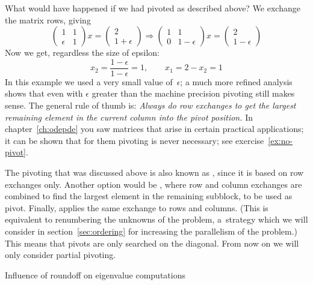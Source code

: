 What would have happened if we had pivoted as described above?
We exchange the matrix rows, giving
\[ 
  \begin{pmatrix}
    1&1\\ \epsilon&1
  \end{pmatrix} x =
  \begin{pmatrix}
    2\\1+\epsilon
  \end{pmatrix}
\Rightarrow
  \begin{pmatrix}
    1&1\\ 0&1-\epsilon
  \end{pmatrix} x=
    \begin{pmatrix}
      2\\ 1-\epsilon
    \end{pmatrix}
\]
Now we get, regardless the size of epsilon:
\[ x_2=\frac{1-\epsilon}{1-\epsilon}=1,\qquad
x_1=2-x_2=1
\]
In this example we used a very small value of~$\epsilon$; a much more
refined analysis shows that even with $\epsilon$ greater than the
machine precision pivoting still makes sense. The general rule of
thumb is: \emph{Always do row exchanges to get the largest remaining
  element in the current column into the pivot position.} In
chapter~\ref{ch:odepde} you saw matrices that arise in certain
practical applications; it can be shown that for them pivoting is
never necessary; see exercise~\ref{ex:no-pivot}.

The pivoting that was discussed above is also known as
, since it is
based on row exchanges only.  Another option would be
, where row and column exchanges are
combined to find the largest element in the remaining subblock, to be
used as pivot. Finally,  applies the
same exchange to rows and columns. (This is equivalent to renumbering
the unknowns of the problem, a~strategy which we will consider in
section~\ref{sec:ordering} for increasing the parallelism of the problem.)
This means that pivots are only
searched on the diagonal.
From now on we will only consider partial pivoting.


 {Influence of roundoff on eigenvalue computations}

